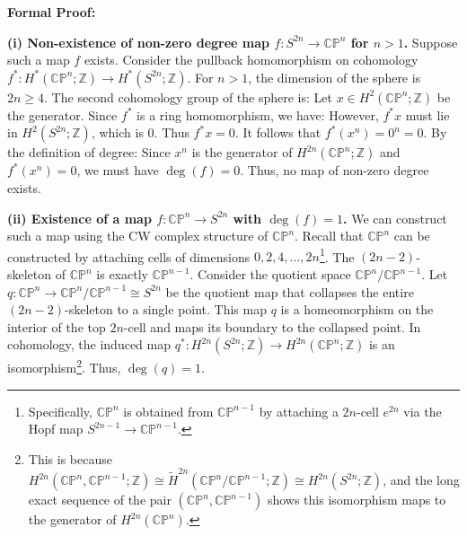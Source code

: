 \begin{solution}
\textbf{Formal Proof:}

\textbf{(i) Non-existence of non-zero degree map $f: S^{2n} \to \mathbb{CP}^n$ for $n > 1$.}
Suppose such a map $f$ exists. Consider the pullback homomorphism on cohomology $f^*: H^*(\mathbb{CP}^n; \mathbb{Z}) \to H^*(S^{2n}; \mathbb{Z})$.
For $n > 1$, the dimension of the sphere is $2n \ge 4$. The second cohomology group of the sphere is:
Let $x \in H^2(\mathbb{CP}^n; \mathbb{Z})$ be the generator. Since $f^*$ is a ring homomorphism, we have:
However, $f^*x$ must lie in $H^2(S^{2n}; \mathbb{Z})$, which is $0$. Thus $f^*x = 0$.
It follows that $f^*(x^n) = 0^n = 0$.
By the definition of degree:
Since $x^n$ is the generator of $H^{2n}(\mathbb{CP}^n; \mathbb{Z})$ and $f^*(x^n) = 0$, we must have $\deg(f) = 0$.
Thus, no map of non-zero degree exists.

\textbf{(ii) Existence of a map $f: \mathbb{CP}^n \to S^{2n}$ with $\deg(f) = 1$.}
We can construct such a map using the CW complex structure of $\mathbb{CP}^n$.
Recall that $\mathbb{CP}^n$ can be constructed by attaching cells of dimensions $0, 2, 4, \dots, 2n$\footnote{Specifically, $\mathbb{CP}^n$ is obtained from $\mathbb{CP}^{n-1}$ by attaching a $2n$-cell $e^{2n}$ via the Hopf map $S^{2n-1} \to \mathbb{CP}^{n-1}$.}.
The $(2n-2)$-skeleton of $\mathbb{CP}^n$ is exactly $\mathbb{CP}^{n-1}$.
Consider the quotient space $\mathbb{CP}^n / \mathbb{CP}^{n-1}$.
Let $q: \mathbb{CP}^n \to \mathbb{CP}^n / \mathbb{CP}^{n-1} \cong S^{2n}$ be the quotient map that collapses the entire $(2n-2)$-skeleton to a single point.
This map $q$ is a homeomorphism on the interior of the top $2n$-cell and maps its boundary to the collapsed point.
In cohomology, the induced map $q^*: H^{2n}(S^{2n}; \mathbb{Z}) \to H^{2n}(\mathbb{CP}^n; \mathbb{Z})$ is an isomorphism\footnote{This is because $H^{2n}(\mathbb{CP}^n, \mathbb{CP}^{n-1}; \mathbb{Z}) \cong \tilde{H}^{2n}(\mathbb{CP}^n / \mathbb{CP}^{n-1}; \mathbb{Z}) \cong H^{2n}(S^{2n}; \mathbb{Z})$, and the long exact sequence of the pair $(\mathbb{CP}^n, \mathbb{CP}^{n-1})$ shows this isomorphism maps to the generator of $H^{2n}(\mathbb{CP}^n)$.}.
Thus, $\deg(q) = 1$.


\end{solution}
